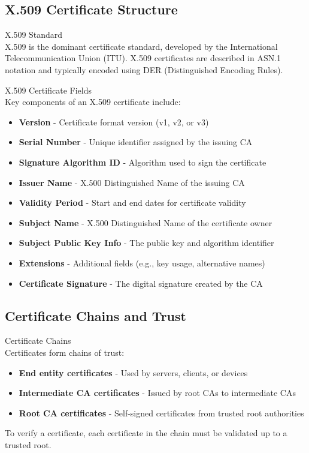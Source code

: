 \subsection{X.509 Certificate Structure}

\begin{definition}{X.509 Standard}\\
X.509 is the dominant certificate standard, developed by the International Telecommunication Union (ITU). X.509 certificates are described in ASN.1 notation and typically encoded using DER (Distinguished Encoding Rules).
\end{definition}

\begin{concept}{X.509 Certificate Fields}\\
Key components of an X.509 certificate include:
\begin{itemize}
    \item \textbf{Version} - Certificate format version (v1, v2, or v3)
    \item \textbf{Serial Number} - Unique identifier assigned by the issuing CA
    \item \textbf{Signature Algorithm ID} - Algorithm used to sign the certificate
    \item \textbf{Issuer Name} - X.500 Distinguished Name of the issuing CA
    \item \textbf{Validity Period} - Start and end dates for certificate validity
    \item \textbf{Subject Name} - X.500 Distinguished Name of the certificate owner
    \item \textbf{Subject Public Key Info} - The public key and algorithm identifier
    \item \textbf{Extensions} - Additional fields (e.g., key usage, alternative names)
    \item \textbf{Certificate Signature} - The digital signature created by the CA
\end{itemize}
\end{concept}

\subsection{Certificate Chains and Trust}

\begin{concept}{Certificate Chains}\\
Certificates form chains of trust:
\begin{itemize}
    \item \textbf{End entity certificates} - Used by servers, clients, or devices
    \item \textbf{Intermediate CA certificates} - Issued by root CAs to intermediate CAs
    \item \textbf{Root CA certificates} - Self-signed certificates from trusted root authorities
\end{itemize}
To verify a certificate, each certificate in the chain must be validated up to a trusted root.
\end{concept}


